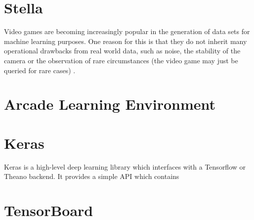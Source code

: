 %
%
%
%
%
\section{Stella}
Video games are becoming increasingly popular in the generation of data sets for machine learning purposes. One reason for this is that they do not inherit many operational drawbacks from real world data, such as noise, the stability of the camera or the observation of rare circumstances (the video game may just be queried for rare cases) \cite{Zsolnai-Feher2016, Richter2016}.


%
%
%
%
%
\section{Arcade Learning Environment}
\cite{Bellemare2015}



%
%
%
%
%
\section{Keras}

Keras is a high-level deep learning library which interfaces with a Tensorflow or Theano backend. It provides a simple API which contains \cite{Chollet2015}




%
%
%
%
%
\section{TensorBoard}




